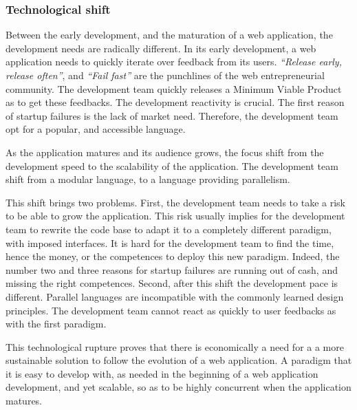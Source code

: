 \subsubsection{Technological shift}

Between the early development, and the maturation of a web application, the development needs are radically different.
In its early development, a web application needs to quickly iterate over feedback from its users.
\textit{``Release early, release often''}, and \textit{``Fail fast''} are the punchlines of the web entrepreneurial community.
The development team quickly releases a Minimum Viable Product as to get these feedbacks.
The development reactivity is crucial.
The first reason of startup failures is the lack of market need.
Therefore, the development team opt for a popular, and accessible language.

As the application matures and its audience grows, the focus shift from the development speed to the scalability of the application.
The development team shift from a modular language, to a language providing parallelism.


This shift brings two problems.
First, the development team needs to take a risk to be able to grow the application.
This risk usually implies for the development team to rewrite the code base to adapt it to a completely different paradigm, with imposed interfaces.
It is hard for the development team to find the time, hence the money, or the competences to deploy this new paradigm.
Indeed, the number two and three reasons for startup failures are running out of cash, and missing the right competences.
Second, after this shift the development pace is different.
Parallel languages are incompatible with the commonly learned design principles.
The development team cannot react as quickly to user feedbacks as with the first paradigm.



This technological rupture proves that there is economically a need for a a more sustainable solution to follow the evolution of a web application.
A paradigm that it is easy to develop with, as needed in the beginning of a web application development, and yet scalable, so as to be highly concurrent when the application matures.


\endinput









